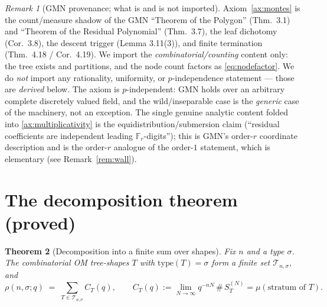 \documentclass[11pt]{article}
\newtheorem{theorem}{Theorem}
\theoremstyle{definition}
\theoremstyle{remark}
\newtheorem{remark}[theorem]{Remark}
\newcommand{\Fr}{\mathbb{F}_r}
\newcommand{\type}{\mathrm{type}}
\newcommand{\rhocount}{\rho}
\begin{document}
\begin{remark}[GMN provenance; what is and is not imported]
Axiom~\ref{ax:montes} is the count/measure shadow of the GMN ``Theorem of the
Polygon'' (Thm.\ 3.1) and ``Theorem of the Residual Polynomial'' (Thm.\ 3.7),
the leaf dichotomy (Cor.\ 3.8), the descent trigger (Lemma 3.11(3)), and finite
termination (Thm.\ 4.18 / Cor.\ 4.19). We import the \emph{combinatorial/counting}
content only: the tree exists and partitions, and the node count factors as
\eqref{eq:nodefactor}. We do \emph{not} import any rationality, uniformity, or
$p$-independence statement --- those are \emph{derived} below. The axiom is
$p$-independent: GMN holds over an arbitrary complete discretely valued field, and
the wild/inseparable case is the \emph{generic} case of the machinery, not an
exception. The single genuine analytic content folded into \ref{ax:multiplicativity}
is the equidistribution/submersion claim (``residual coefficients are independent
leading $\Fr$-digits''); this is GMN's order-$r$ coordinate description and is the
order-$r$ analogue of the order-$1$ statement, which is elementary (see
Remark~\ref{rem:wall}).
\end{remark}

\section{The decomposition theorem (proved)}\label{sec:decomp}

\begin{theorem}[Decomposition into a finite sum over shapes]\label{thm:decomp}
Fix $n$ and a type $\sigma$. The combinatorial OM tree-shapes $T$ with
$\type(T)=\sigma$ form a \emph{finite} set $\mathcal T_{n,\sigma}$, and
\begin{equation}\label{eq:decomp}
  \rhocount(n,\sigma;q)\;=\;\sum_{T\in\mathcal T_{n,\sigma}} C_T(q),
  \qquad
  C_T(q):=\lim_{N\to\infty} q^{-nN}\,\#\,S_T^{(N)} = \mu(\text{stratum of }T).
\end{equation}
\end{theorem}
\end{document}
